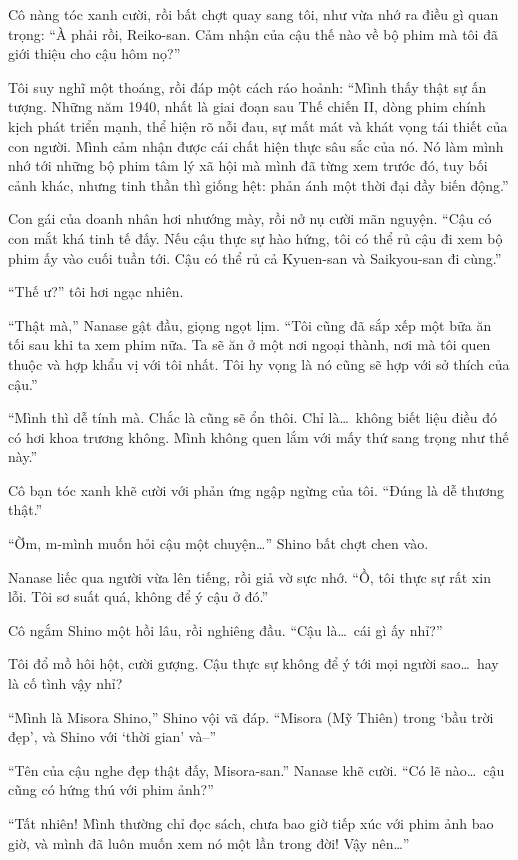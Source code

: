 \documentclass[../main.tex]{subfiles}
\begin{document}
Cô nàng tóc xanh cười, rồi bất chợt quay sang tôi, như vừa nhớ ra điều gì quan trọng: ``À phải rồi, Reiko-san. Cảm nhận của cậu thế nào về bộ phim mà tôi đã giới thiệu cho cậu hôm nọ?''

Tôi suy nghĩ một thoáng, rồi đáp một cách ráo hoảnh: ``Mình thấy thật sự ấn tượng. Những năm 1940, nhất là giai đoạn sau Thế chiến II, dòng phim chính kịch phát triển mạnh, thể hiện rõ nỗi đau, sự mất mát và khát vọng tái thiết của con người. Mình cảm nhận được cái chất hiện thực sâu sắc của nó. Nó làm mình nhớ tới những bộ phim tâm lý xã hội mà mình đã từng xem trước đó, tuy bối cảnh khác, nhưng tinh thần thì giống hệt: phản ánh một thời đại đầy biến động.''

Con gái của doanh nhân hơi nhướng mày, rồi nở nụ cười mãn nguyện. ``Cậu có con mắt khá tinh tế đấy. Nếu cậu thực sự hào hứng, tôi có thể rủ cậu đi xem bộ phim ấy vào cuối tuần tới. Cậu có thể rủ cả Kyuen-san và Saikyou-san đi cùng.''

``Thế ư?'' tôi hơi ngạc nhiên.

``Thật mà,'' Nanase gật đầu, giọng ngọt lịm. ``Tôi cũng đã sắp xếp một bữa ăn tối sau khi ta xem phim nữa. Ta sẽ ăn ở một nơi ngoại thành, nơi mà tôi quen thuộc và hợp khẩu vị với tôi nhất. Tôi hy vọng là nó cũng sẽ hợp với sở thích của cậu.''

``Mình thì dễ tính mà. Chắc là cũng sẽ ổn thôi. Chỉ là\dots\ không biết liệu điều đó có hơi khoa trương không. Mình không quen lắm với mấy thứ sang trọng như thế này.''

Cô bạn tóc xanh khẽ cười với phản ứng ngập ngừng của tôi. ``Đúng là dễ thương thật.''

``Ờm, m-mình muốn hỏi cậu một chuyện\dots'' Shino bất chợt chen vào.

Nanase liếc qua người vừa lên tiếng, rồi giả vờ sực nhớ. ``Ồ, tôi thực sự rất xin lỗi. Tôi sơ suất quá, không để ý cậu ở đó.''

Cô ngắm Shino một hồi lâu, rồi nghiêng đầu. ``Cậu là\dots\ cái gì ấy nhỉ?''

Tôi đổ mồ hôi hột, cười gượng. Cậu thực sự không để ý tới mọi người sao\dots\ hay là cố tình vậy nhỉ?

``Mình là Misora Shino,'' Shino vội vã đáp. ``Misora (Mỹ Thiên) trong `bầu trời đẹp', và Shino với `thời gian' và--''

``Tên của cậu nghe đẹp thật đấy, Misora-san.'' Nanase khẽ cười. ``Có lẽ nào\dots\ cậu cũng có hứng thú với phim ảnh?''

``Tất nhiên! Mình thường chỉ đọc sách, chưa bao giờ tiếp xúc với phim ảnh bao giờ, và mình đã luôn muốn xem nó một lần trong đời! Vậy nên\dots''
\end{document}
